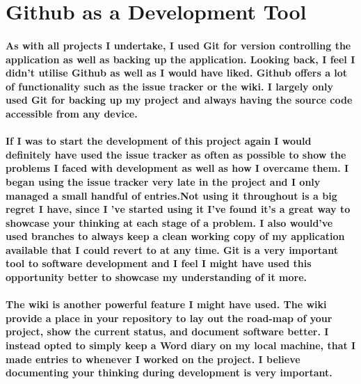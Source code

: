 \section{Github as a Development Tool}
\paragraph{As with all projects I undertake, I used Git for version controlling the application as well as backing up the application. Looking back, I feel I didn't utilise Github as well as I would have liked. Github offers a lot of functionality such as the issue tracker or the wiki. I largely only used Git for backing up my project and always having the source code accessible from any device.}
\paragraph{If I was to start the development of this project again I would definitely have used the issue tracker as often as possible to show the problems I faced with development as well as how I overcame them. I began using the issue tracker very late in the project and I only managed a small handful of entries.Not using it throughout is a  big regret I have, since I 've started using it I've found it's a great way to showcase your thinking at each stage of a problem. I also would've used branches to always keep a clean working copy of my application available that I could revert to at any time. Git is a very important tool to software development and I feel I might have used this opportunity better to showcase my understanding of it more.}
\paragraph{The wiki is another powerful feature I might have used. The wiki provide a place in your repository to lay out the road-map of your project, show the current status, and document software better. I instead opted to simply keep a Word diary on my local machine, that I made entries to whenever I worked on the project. I believe documenting your thinking during development is very important.}
